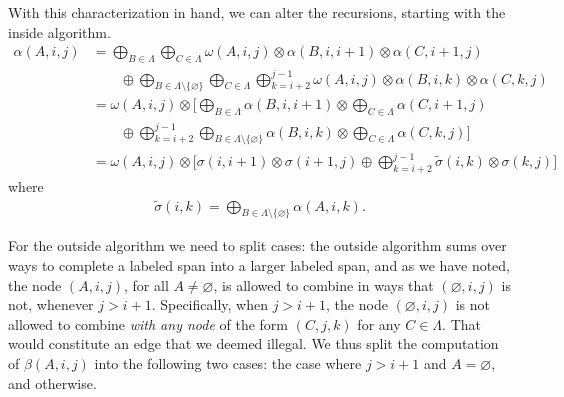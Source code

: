     With this characterization in hand, we can alter the recursions, starting with the inside algorithm.
    \begin{align}
      \label{eq:inside-pruned}
      \alpha(A, i, j)
        &= \displaystyle\bigoplus_{B \in \Lambda} \displaystyle\bigoplus_{C \in \Lambda} \omega(A, i, j) \otimes \alpha(B,i,i+1) \otimes \alpha(C,i+1,j) \nonumber \\
          &\qquad\oplus \displaystyle\bigoplus_{B \in \Lambda \setminus \{ \varnothing \} } \displaystyle\bigoplus_{C \in \Lambda} \displaystyle\bigoplus_{k=i+2}^{j-1} \omega(A, i, j) \otimes \alpha(B,i,k) \otimes \alpha(C,k,j) \nonumber \\
        &= \omega(A, i, j) \otimes  \Bigg[ \displaystyle\bigoplus_{B \in \Lambda}\alpha(B,i,i+1) \otimes  \displaystyle\bigoplus_{C \in \Lambda} \alpha(C,i+1,j)  \nonumber \\
          &\qquad\oplus \displaystyle\bigoplus_{k=i+2}^{j-1} \displaystyle\bigoplus_{B \in \Lambda \setminus \{ \varnothing \} } \alpha(B,i,k) \otimes \displaystyle\bigoplus_{C \in \Lambda} \alpha(C,k,j)  \Bigg]  \nonumber \\
        &= \omega(A, i, j) \otimes \Bigg[ \sigma(i,i+1) \otimes \sigma(i+1,j) \oplus \displaystyle\bigoplus_{k=i+2}^{j-1} \tilde{\sigma}(i,k) \otimes \sigma(k,j) \Bigg]
    \end{align}
    where
    \begin{align}
      \tilde{\sigma}(i,k) = \displaystyle\bigoplus_{B \in \Lambda \setminus \{ \varnothing \} } \alpha(A, i, k).
    \end{align}

    For the outside algorithm we need to split cases: the outside algorithm sums over ways to complete a labeled span into a larger labeled span, and as we have noted, the node $(A, i, j)$, for all $A \neq \varnothing$, is allowed to combine in ways that $(\varnothing, i, j)$ is not, whenever $j > i + 1$. Specifically, when $j > i + 1$, the node $(\varnothing, i, j)$ is not allowed to combine \textit{with any node} of the form $(C, j, k)$ for any $C \in \Lambda$. That would constitute an edge that we deemed illegal. We thus split the computation of $\beta(A, i, j)$ into the following two cases: the case where $j > i + 1$ and $ A = \varnothing$, and otherwise.

